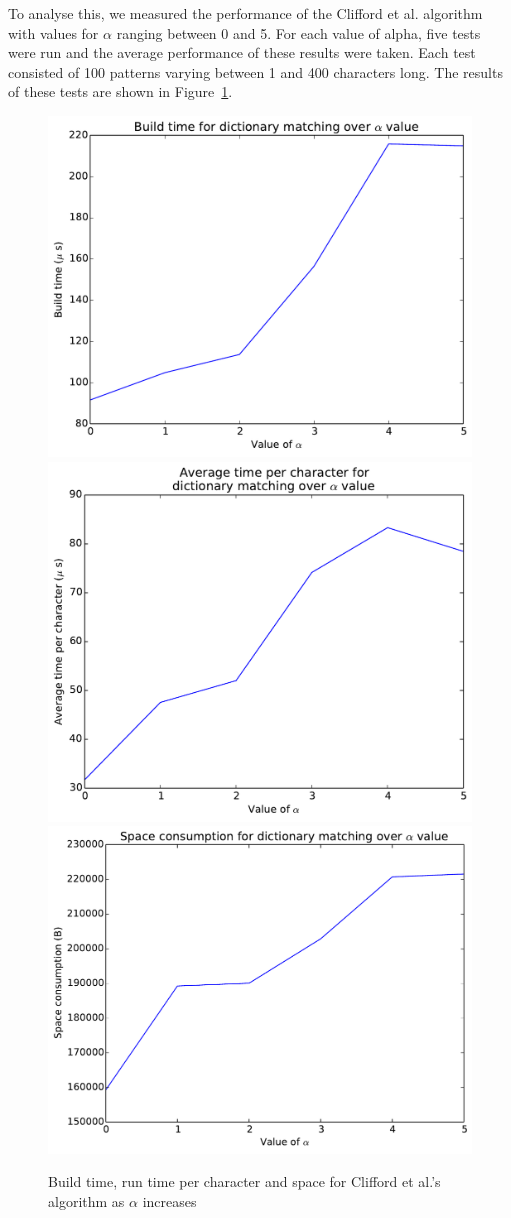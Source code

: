 \documentclass[ %
                    author={Dominic Joseph Moylett},
                    degree={MEng},
                     title={Dictionary Matching with Fingerprints},
                  subtitle={An Empirical Analysis},
                      type={research},
                      year={2015} ]{dissertation}
\begin{document}
To analyse this, we measured the performance of the Clifford et al. algorithm with values for $\alpha$ ranging between 0 and 5. For each value of alpha, five tests were run and the average performance of these results were taken. Each test consisted of 100 patterns varying between 1 and 400 characters long. The results of these tests are shown in Figure~\ref{fig:alpha-results}.

\begin{figure}[t]
\begin{center}
  \includegraphics[width=0.5\linewidth]{build_alpha}\\
  \includegraphics[width=0.5\linewidth]{time_alpha}\includegraphics[width=0.5\linewidth]{size_alpha}
\end{center}
\caption{Build time, run time per character and space for Clifford et al.'s algorithm as $\alpha$ increases}
\label{fig:alpha-results}
\end{figure}
\end{document}
